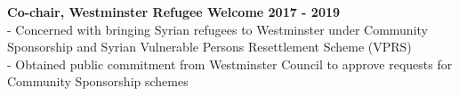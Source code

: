 \noindent \textbf{Co-chair, Westminster Refugee Welcome \hfill 2017 - 2019}\\
- Concerned with bringing Syrian refugees to Westminster under Community Sponsorship and Syrian Vulnerable Persons Resettlement Scheme (VPRS)\\
- Obtained public commitment from Westminster Council to approve requests for Community Sponsorship schemes	 \medskip


